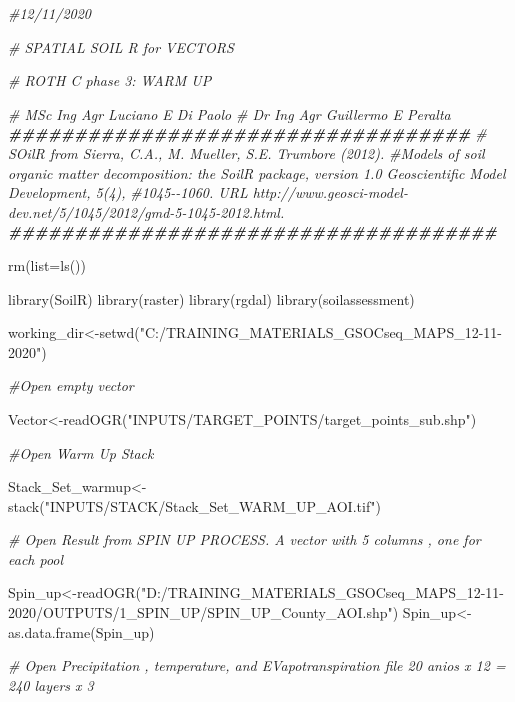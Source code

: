 \documentclass[
  10pt,
  b5paper,
]{book}
\newenvironment{Shaded}{\begin{snugshade}}{\end{snugshade}}
\newcommand{\AttributeTok}[1]{\textcolor[rgb]{0.77,0.63,0.00}{#1}}
\newcommand{\CommentTok}[1]{\textcolor[rgb]{0.56,0.35,0.01}{\textit{#1}}}
\newcommand{\DocumentationTok}[1]{\textcolor[rgb]{0.56,0.35,0.01}{\textbf{\textit{#1}}}}
\newcommand{\FunctionTok}[1]{\textcolor[rgb]{0.00,0.00,0.00}{#1}}
\newcommand{\NormalTok}[1]{#1}
\newcommand{\OtherTok}[1]{\textcolor[rgb]{0.56,0.35,0.01}{#1}}
\newcommand{\StringTok}[1]{\textcolor[rgb]{0.31,0.60,0.02}{#1}}
\begin{document}
\begin{Shaded}
\begin{Highlighting}[]
\CommentTok{\#12/11/2020}

\CommentTok{\# SPATIAL SOIL R  for VECTORS}

\CommentTok{\#   ROTH C phase 3: WARM UP}

\CommentTok{\# MSc Ing Agr Luciano E Di Paolo}
\CommentTok{\# Dr Ing Agr Guillermo E Peralta}
\DocumentationTok{\#\#\#\#\#\#\#\#\#\#\#\#\#\#\#\#\#\#\#\#\#\#\#\#\#\#\#\#\#\#\#\#\#\#\#}
\CommentTok{\# SOilR from Sierra, C.A., M. Mueller, S.E. Trumbore (2012). }
\CommentTok{\#Models of soil organic matter decomposition: the SoilR package, version 1.0 Geoscientific Model Development, 5(4), }
\CommentTok{\#1045{-}{-}1060. URL http://www.geosci{-}model{-}dev.net/5/1045/2012/gmd{-}5{-}1045{-}2012.html.}
\DocumentationTok{\#\#\#\#\#\#\#\#\#\#\#\#\#\#\#\#\#\#\#\#\#\#\#\#\#\#\#\#\#\#\#\#\#\#\#\#\#}

\FunctionTok{rm}\NormalTok{(}\AttributeTok{list=}\FunctionTok{ls}\NormalTok{()) }

\FunctionTok{library}\NormalTok{(SoilR)}
\FunctionTok{library}\NormalTok{(raster)}
\FunctionTok{library}\NormalTok{(rgdal)}
\FunctionTok{library}\NormalTok{(soilassessment)}

\NormalTok{working\_dir}\OtherTok{\textless{}{-}}\FunctionTok{setwd}\NormalTok{(}\StringTok{"C:/TRAINING\_MATERIALS\_GSOCseq\_MAPS\_12{-}11{-}2020"}\NormalTok{)}

\CommentTok{\#Open empty vector}

\NormalTok{Vector}\OtherTok{\textless{}{-}}\FunctionTok{readOGR}\NormalTok{(}\StringTok{"INPUTS/TARGET\_POINTS/target\_points\_sub.shp"}\NormalTok{)}

\CommentTok{\#Open Warm Up Stack}

\NormalTok{Stack\_Set\_warmup}\OtherTok{\textless{}{-}} \FunctionTok{stack}\NormalTok{(}\StringTok{"INPUTS/STACK/Stack\_Set\_WARM\_UP\_AOI.tif"}\NormalTok{)}

\CommentTok{\# Open Result from SPIN UP PROCESS. A vector with 5 columns , one for each pool}

\NormalTok{Spin\_up}\OtherTok{\textless{}{-}}\FunctionTok{readOGR}\NormalTok{(}\StringTok{"D:/TRAINING\_MATERIALS\_GSOCseq\_MAPS\_12{-}11{-}2020/OUTPUTS/1\_SPIN\_UP/SPIN\_UP\_County\_AOI.shp"}\NormalTok{)}
\NormalTok{Spin\_up}\OtherTok{\textless{}{-}}\FunctionTok{as.data.frame}\NormalTok{(Spin\_up)}

\CommentTok{\# Open Precipitation , temperature, and EVapotranspiration file 20 anios x 12 = 240 layers x 3}


\end{Highlighting}
\end{Shaded}
\end{document}
